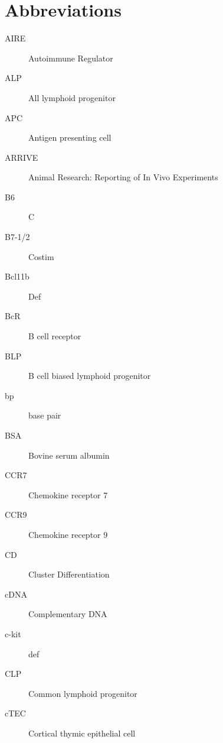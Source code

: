 
\chapter{Abbreviations}

\begin{description}



\item[AIRE]		
Autoimmune Regulator

\item[ALP]
All lymphoid progenitor



\item[APC]
Antigen presenting cell

\item[ARRIVE] 
Animal Research: Reporting of In Vivo Experiments

\item[B6]
C

\item[B7-1/2]
Costim

\item[Bcl11b]
Def

\item[BcR]
B cell receptor

\item[BLP]
B cell biased lymphoid progenitor

\item[bp]
base pair

\item[BSA]
Bovine serum albumin

\item[CCR7]
Chemokine receptor 7

\item[CCR9]
Chemokine receptor 9

\item[CD]
Cluster Differentiation

\item[cDNA]
Complementary DNA

\item[c-kit]
def

\item[CLP]
Common lymphoid progenitor

\item[cTEC]
Cortical thymic epithelial cell


\end{description}
